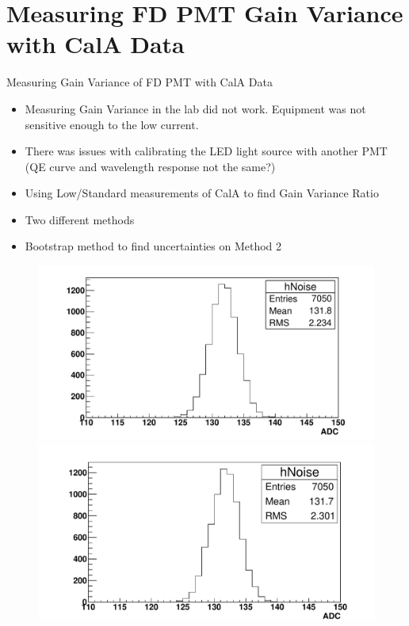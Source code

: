 \chapter[Measuring FD PMT Gain Variance with CalA Data]{\centering Measuring FD PMT Gain Variance with CalA Data \\}\label{Ch:GainVariance}

Measuring Gain Variance of FD PMT with CalA Data
\begin{itemize}
\item Measuring Gain Variance in the lab did not work. Equipment was not sensitive enough to the low current.
\item There was issues with calibrating the LED light source with another PMT (QE curve and wavelength response not the same?)
\item Using Low/Standard measurements of CalA to find Gain Variance Ratio
\item Two different methods
\item Bootstrap method to find uncertainties on Method 2
\end{itemize}


\begin{figure} %
\includegraphics[width=\textwidth]{chapters/graphs/GainVarsMeas/LL_m04_2016-06-11/example_NoiseHist1.pdf}
\caption{}
\vspace{3mm}
\includegraphics[width=\textwidth]{chapters/graphs/GainVarsMeas/LL_m04_2016-06-11/example_NoiseHist2.pdf}
\caption{}
\end{figure}

